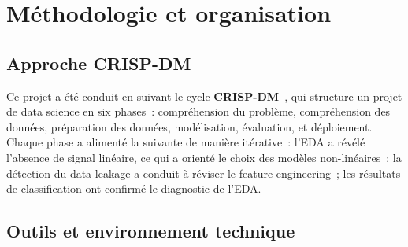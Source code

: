
\section{Méthodologie et organisation}

\subsection{Approche CRISP-DM}

Ce projet a été conduit en suivant le cycle \textbf{CRISP-DM}~\cite{chapman2000}, qui structure un projet de data science en six phases~: compréhension du problème, compréhension des données, préparation des données, modélisation, évaluation, et déploiement. Chaque phase a alimenté la suivante de manière itérative~: l'EDA a révélé l'absence de signal linéaire, ce qui a orienté le choix des modèles non-linéaires~; la détection du data leakage a conduit à réviser le feature engineering~; les résultats de classification ont confirmé le diagnostic de l'EDA.

\subsection{Outils et environnement technique}

\begin{table}[H]
\centering
\caption{Stack technique du projet}
\label{tab:tech_stack}
\end{table}

